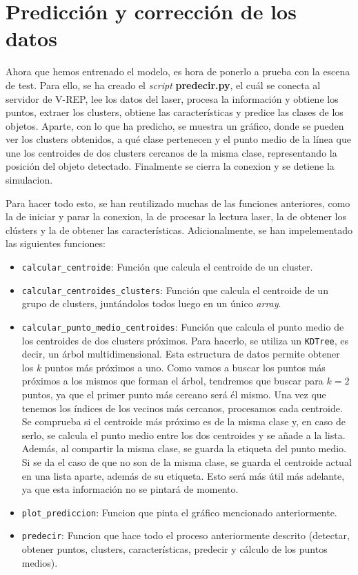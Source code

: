 \documentclass[11pt,a4paper]{article}
\begin{document}
\section{Predicción y corrección de los datos}

Ahora que hemos entrenado el modelo, es hora de ponerlo a prueba con la escena
de test. Para ello, se ha creado el \textit{script} \textbf{predecir.py}, el cuál
se conecta al servidor de V-REP, lee los datos del laser, procesa la información y
obtiene los puntos, extraer los clusters, obtiene las características y predice
las clases de los objetos. Aparte, con lo que ha predicho, se muestra un gráfico, donde
se pueden ver los clusters obtenidos, a qué clase pertenecen y el punto medio de la línea
que une los centroides de dos clusters cercanos de la misma clase, representando la posición del objeto
detectado. Finalmente se cierra la conexion y se detiene la simulacion.

Para hacer todo esto, se han reutilizado muchas de las funciones anteriores, como la 
de iniciar y parar la conexion, la de procesar la lectura laser, la de obtener los
clústers y la de obtener las características. Adicionalmente, se han impelementado las
siguientes funciones:

\begin{itemize}[label=\textbullet]
	\item \texttt{calcular\_centroide}: Función que calcula el centroide de un cluster.
	\item \texttt{calcular\_centroides\_clusters}: Función que calcula el centroide de
	un grupo de clusters, juntándolos todos luego en un único \textit{array}.
	\item \texttt{calcular\_punto\_medio\_centroides}: Función que calcula el punto medio
	de los centroides de dos clusters próximos. Para hacerlo, se utiliza un \texttt{KDTree},
	es decir, un árbol multidimensional. Esta estructura de datos permite obtener
	los $k$ puntos más próximos a uno. Como vamos a buscar los puntos más próximos a los mismos
	que forman el árbol, tendremos que buscar para $k=2$ puntos, ya que el primer punto más cercano
	será él mismo. Una vez que tenemos los índices de los vecinos más cercanos, procesamos cada
	centroide. Se comprueba si el centroide más próximo es de la misma clase y, en caso de serlo,
	se calcula el punto medio entre los dos centroides y se añade a la lista. Además, al compartir la misma clase,
	se guarda la etiqueta del punto medio. Si se da el caso de que no son de la misma clase, se guarda
	el centroide actual en una lista aparte, además de su etiqueta. Esto será más útil más adelante,
	ya que esta información no se pintará de momento.
	\item \texttt{plot\_prediccion}: Funcion que pinta el gráfico mencionado anteriormente.
	\item \texttt{predecir}: Funcion que hace todo el proceso anteriormente descrito (detectar,
	obtener puntos, clusters, características, predecir y cálculo de los puntos medios).
\end{itemize}
\end{document}
